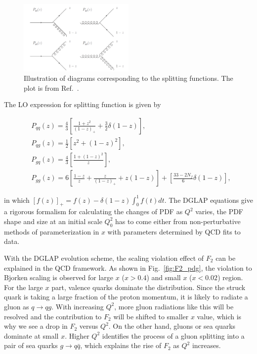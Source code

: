 \begin{figure}
\centering
\includegraphics[width=0.5\textwidth]{plots/chpt2/split_fun.png}
\caption[Splitting functions] {
Illustration of diagrams corresponding to the splitting functions. The plot is from Ref.~\cite{Belov:2013oda}. }
\label{fig:split_fun}
\end{figure}

The LO expression for splitting function is given by


\begin{align}
& P_{qq}(z)=\frac{4}{3}[\frac{1+z^{2}}{(1-z)_{+}}+\frac{3}{2}\delta(1-z)], \\
& P_{qg}(z)=\frac{1}{2}[z^{2}+(1-z)^{2}], \\
& P_{gq}(z)=\frac{4}{3}[\frac{1+(1-z)^{2}}{z}], \\
& P_{gg}(z)=6[\frac{1-z}{z}+\frac{z}{(1-z)_{+}}+z(1-z)]+[\frac{33-2N_{f}}{6}\delta(1-z)],
\end{align}


in which $[f(z)]_{+}=f(z)-\delta(1-z)\int^{1}_{0}f(t)dt$.
The DGLAP equations give a rigorous formalism for calculating the changes of PDF
as $Q^{2}$ varies, the PDF shape and size at an initial scale $Q^{2}_{0}$ has to
come either from non-perturbative methods of parameterization in $x$ with
parameters determined by QCD fits to data.

With the DGLAP evolution scheme, the scaling violation effect of $F_{2}$ can be
explained in the QCD framework. As shown in Fig.~\ref{fig:F2_pdg}, the violation
to Bjorken scaling is observed for large $x$ ($x>0.4$) and small $x$ ($x<0.02$)
region. For the large $x$ part, valence quarks dominate the distribution. Since
the struck quark is taking a large fraction of the proton momentum, it is likely
to radiate a gluon as $q\rightarrow qg$. With increasing $Q^{2}$, more gluon
radiations like this will be resolved and the contribution to $F_{2}$ will be
shifted to smaller $x$ value, which is why we see a drop in $F_{2}$ versus
$Q^{2}$. On the other hand, gluons or sea quarks dominate at small $x$. Higher
$Q^{2}$ identifies the process of a gluon splitting into a pair of sea quarks
$g\rightarrow q\bar{q}$, which explains the rise of $F_{2}$ as $Q^{2}$
increases.

